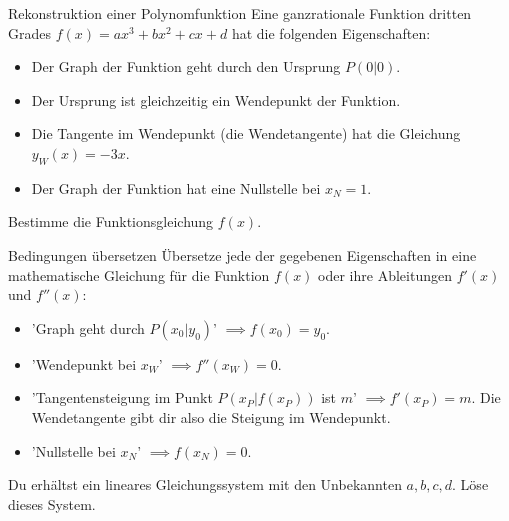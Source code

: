 \begin{aufgabenumgebung}{Rekonstruktion einer Polynomfunktion}
Eine ganzrationale Funktion dritten Grades $f(x) = ax^3 + bx^2 + cx + d$ hat die folgenden Eigenschaften:
\begin{itemize}
    \item Der Graph der Funktion geht durch den Ursprung $P(0|0)$.
    \item Der Ursprung ist gleichzeitig ein Wendepunkt der Funktion.
    \item Die Tangente im Wendepunkt (die Wendetangente) hat die Gleichung $y_W(x) = -3x$.
    \item Der Graph der Funktion hat eine Nullstelle bei $x_N = 1$.
\end{itemize}
Bestimme die Funktionsgleichung $f(x)$.

\begin{tippumgebung}{Bedingungen übersetzen}
Übersetze jede der gegebenen Eigenschaften in eine mathematische Gleichung für die Funktion $f(x)$ oder ihre Ableitungen $f'(x)$ und $f''(x)$:
\begin{itemize}
    \item 'Graph geht durch $P(x_0|y_0)$' $\implies f(x_0) = y_0$.
    \item 'Wendepunkt bei $x_W$' $\implies f''(x_W) = 0$.
    \item 'Tangentensteigung im Punkt $P(x_P|f(x_P))$ ist $m$' $\implies f'(x_P) = m$. Die Wendetangente gibt dir also die Steigung im Wendepunkt.
    \item 'Nullstelle bei $x_N$' $\implies f(x_N) = 0$.
\end{itemize}
Du erhältst ein lineares Gleichungssystem mit den Unbekannten $a, b, c, d$. Löse dieses System.
\end{tippumgebung}


\end{aufgabenumgebung}

